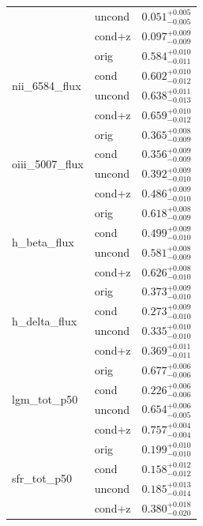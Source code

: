 \begin{table}[htbp]
\begin{tabular}{llc}
 & uncond & $0.051^{+0.005}_{-0.005}$ \\
 & cond+z & $0.097^{+0.009}_{-0.009}$ \\
\midrule
\multirow{4}{*}{nii\_6584\_flux} & orig & $0.584^{+0.010}_{-0.011}$ \\
 & cond & $0.602^{+0.010}_{-0.012}$ \\
 & uncond & $0.638^{+0.011}_{-0.013}$ \\
 & cond+z & $0.659^{+0.010}_{-0.012}$ \\
\midrule
\multirow{4}{*}{oiii\_5007\_flux} & orig & $0.365^{+0.008}_{-0.009}$ \\
 & cond & $0.356^{+0.009}_{-0.009}$ \\
 & uncond & $0.392^{+0.009}_{-0.010}$ \\
 & cond+z & $0.486^{+0.009}_{-0.010}$ \\
\midrule
\multirow{4}{*}{h\_beta\_flux} & orig & $0.618^{+0.008}_{-0.009}$ \\
 & cond & $0.499^{+0.009}_{-0.010}$ \\
 & uncond & $0.581^{+0.008}_{-0.009}$ \\
 & cond+z & $0.626^{+0.008}_{-0.010}$ \\
\midrule
\multirow{4}{*}{h\_delta\_flux} & orig & $0.373^{+0.009}_{-0.010}$ \\
 & cond & $0.273^{+0.009}_{-0.010}$ \\
 & uncond & $0.335^{+0.010}_{-0.010}$ \\
 & cond+z & $0.369^{+0.011}_{-0.011}$ \\
\midrule
\multirow{4}{*}{lgm\_tot\_p50} & orig & $0.677^{+0.006}_{-0.006}$ \\
 & cond & $0.226^{+0.006}_{-0.006}$ \\
 & uncond & $0.654^{+0.006}_{-0.005}$ \\
 & cond+z & $0.757^{+0.004}_{-0.004}$ \\
\midrule
\multirow{4}{*}{sfr\_tot\_p50} & orig & $0.199^{+0.010}_{-0.010}$ \\
 & cond & $0.158^{+0.012}_{-0.012}$ \\
 & uncond & $0.185^{+0.013}_{-0.014}$ \\
 & cond+z & $0.380^{+0.018}_{-0.020}$ \\
\bottomrule
\end{tabular}
\end{table}